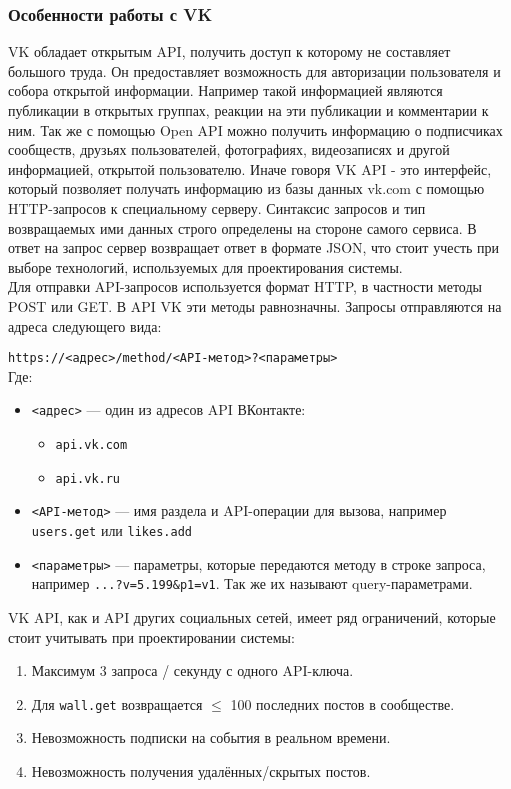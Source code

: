         \subsubsection{Особенности работы с VK}
            VK обладает открытым API, получить доступ к которому не составляет большого труда. Он предоставляет возможность для авторизации пользователя и собора открытой информации. Например такой информацией являются публикации в открытых группах, реакции на эти публикации и комментарии к ним. Так же с помощью Open API можно получить информацию о подписчиках сообществ, друзьях пользователей, фотографиях, видеозаписях и другой информацией, открытой пользователю. Иначе говоря VK API - это интерфейс, который позволяет получать информацию из базы данных vk.com с помощью HTTP-запросов к специальному серверу. Синтаксис запросов и тип возвращаемых ими данных строго определены на стороне самого сервиса. В ответ на запрос сервер возвращает ответ в формате JSON, что стоит учесть при выборе технологий, используемых для проектирования системы. \\

            Для отправки API-запросов используется  формат HTTP, в частности методы POST или GET. В API VK эти методы равнозначны. Запросы отправляются на адреса следующего вида:

            \texttt{https://<адрес>/method/<API-метод>?<параметры>} \\

            Где:    
            \begin{itemize}
                \item \texttt{<адрес>} — один из адресов API ВКонтакте:
                \begin{itemize}
                    \item \texttt{api.vk.com}
                    \item \texttt{api.vk.ru}
                \end{itemize}
                \item \texttt{<API-метод>} — имя раздела и API-операции для вызова, например \texttt{users.get} или \texttt{likes.add}
                \item \texttt{<параметры>} — параметры, которые передаются методу в строке запроса, например \texttt{...?v=5.199\&p1=v1}. Так же их называют query-параметрами.
            \end{itemize}

            VK API, как и API других социальных сетей, имеет ряд ограничений, которые стоит учитывать при проектировании системы:
            \begin{enumerate}
                \item Максимум 3 запроса / секунду с одного API-ключа.
                \item Для \texttt{wall.get} возвращается $\leq$ 100 последних постов в сообществе.
                \item Невозможность подписки на события в реальном времени.
                \item Невозможность получения удалённых/скрытых постов.
            \end{enumerate}

